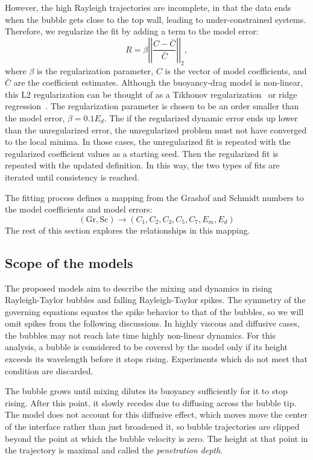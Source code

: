 However, the high Rayleigh trajectories are incomplete, in that the data ends when the bubble gets close to the top wall, leading to under-constrained systems.
Therefore, we regularize the fit by adding a term to the model error:
\begin{equation}
R = \beta \left| \left| \frac{C - \bar{C}}{\bar{C}} \right| \right|_2,
\end{equation}
where $\beta$ is the regularization parameter,
$C$ is the vector of model coefficients, and
$\bar{C}$ are the coefficient estimates.
Although the buoyancy-drag model is non-linear, this L2 regularization can be thought of as a Tikhonov regularization~\cite{roths2001generalized} or ridge regression~\cite{marquardt1975ridge}.
The regularization parameter is chosen to be an order smaller than the model error, $\beta = 0.1 E_d$.
The if the regularized dynamic error ends up lower than the unregularized error, the unregularized problem must not have converged to the local minima.
In those cases, the unregularized fit is repeated with the regularized coefficient values as a starting seed.
Then the regularized fit is repeated with the updated definition.
In this way, the two types of fits are iterated until consistency is reached.

The fitting process defines a mapping from the Grashof and Schmidt numbers to the model coefficients and model errors:
\begin{equation}
\left(\text{Gr}, \text{Sc}\right) \rightarrow \left(C_1, C_2, C_3, C_5, C_7, E_m, E_d\right) 
\end{equation}
The rest of this section explores the relationships in this mapping.

\subsection{Scope of the models}

The proposed models aim to describe the mixing and dynamics in rising Rayleigh-Taylor bubbles and falling Rayleigh-Taylor spikes.
The symmetry of the governing equations equates the spike behavior to that of the bubbles, so we will omit spikes from the following discussions.
In highly viscous and diffusive cases, the bubbles may not reach late time highly non-linear dynamics.
For this analysis, a bubble is considered to be covered by the model only if its height exceeds its wavelength before it stops rising.
Experiments which do not meet that condition are discarded.

The bubble grows until mixing dilutes its buoyancy sufficiently for it to stop rising.
After this point, it slowly recedes due to diffusing across the bubble tip.
The model does not account for this diffusive effect, which moves move the center of the interface rather than just broadened it, so bubble trajectories are clipped beyond the point at which the bubble velocity is zero.
The height at that point in the trajectory is maximal and called the \textit{penetration depth}.


